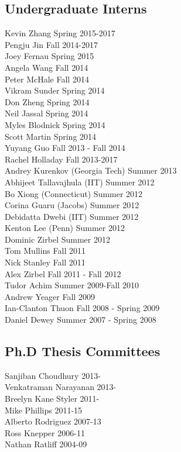 \subsection{Undergraduate Interns}
\noindent
Kevin Zhang  \hfill Spring 2015-2017\\
Pengju Jin  \hfill Fall 2014-2017\\
Joey Fernau  \hfill Spring 2015\\
Angela Wang  \hfill Fall 2014\\
Peter McHale  \hfill Fall 2014\\
Vikram Sunder  \hfill Spring 2014\\
Don Zheng  \hfill Spring 2014\\
Neil Jassal  \hfill Spring 2014\\
Myles Blodnick  \hfill Spring 2014\\
Scott Martin  \hfill Spring 2014\\
Yuyang Guo  \hfill Fall 2013 - Fall 2014\\
Rachel Holladay  \hfill Fall 2013-2017\\
Andrey Kurenkov (Georgia Tech) \hfill Summer 2013\\ 
Abhijeet Tallavajhula (IIT) \hfill Summer 2012\\
Bo Xiong (Connecticut) \hfill Summer 2012\\
Corina Guaru (Jacobs) \hfill Summer 2012\\
Debidatta Dwebi (IIT) \hfill Summer 2012\\
Kenton Lee (Penn) \hfill Summer 2012\\
Dominic Zirbel  \hfill Summer 2012\\
Tom Mullins  \hfill Fall 2011\\
Nick Stanley  \hfill Fall 2011\\
Alex Zirbel  \hfill Fall 2011 - Fall 2012\\
Tudor Achim  \hfill Summer 2009-Fall 2010\\
Andrew Yeager  \hfill Fall 2009\\
Ian-Clanton Thuon  \hfill Fall 2008 - Spring 2009\\
Daniel Dewey  \hfill Summer 2007 - Spring 2008\\

\subsection{Ph.D Thesis Committees}
\noindent
Sanjiban Choudhury \hfill 2013-\\
Venkatraman Narayanan \hfill 2013-\\
Breelyn Kane Styler  \hfill 2011-\\ 
Mike Phillips  \hfill 2011-15\\
Alberto Rodriguez  \hfill 2007-13\\
Ross Knepper  \hfill 2006-11\\
Nathan Ratliff  \hfill 2004-09\\
